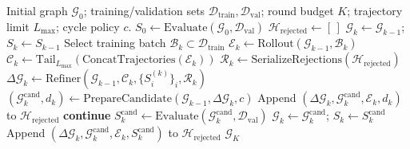 \begingroup
\setlength{\intextsep}{5pt}
\begin{algorithm}[H]
\small
\caption{Offline Closed-Loop Procedural Graph Self-Evolution}
\label{alg:evolution}
\begin{algorithmic}[1]
    \REQUIRE Initial graph $\mathcal{G}_0$; training/validation sets $\mathcal{D}_{\mathrm{train}},\mathcal{D}_{\mathrm{val}}$;
    round budget $K$; trajectory limit $L_{\max}$; cycle policy $c$.
    \STATE $S_0 \leftarrow \mathrm{Evaluate}(\mathcal{G}_0,\mathcal{D}_{\mathrm{val}})$
    \STATE $\mathcal{H}_{\mathrm{rejected}} \leftarrow [\,]$
        \STATE $\mathcal{G}_k \leftarrow \mathcal{G}_{k-1}$; $S_k \leftarrow S_{k-1}$ 
        \STATE Select training batch $\mathcal{B}_k \subset \mathcal{D}_{\mathrm{train}}$
        \STATE $\mathcal{E}_k \leftarrow \mathrm{Rollout}(\mathcal{G}_{k-1},\mathcal{B}_k)$ 
        \STATE $\mathcal{C}_k \leftarrow \mathrm{Tail}_{L_{\max}}(\mathrm{ConcatTrajectories}(\mathcal{E}_k))$
        \STATE $\mathcal{R}_k \leftarrow \mathrm{SerializeRejections}(\mathcal{H}_{\mathrm{rejected}})$
        \STATE $\Delta\mathcal{G}_k \leftarrow \mathrm{Refiner}(\mathcal{G}_{k-1},\mathcal{C}_k,\{S_i^{(k)}\}_i,\mathcal{R}_k)$
        \STATE $(\mathcal{G}_k^{\mathrm{cand}},d_k) \leftarrow \mathrm{PrepareCandidate}(\mathcal{G}_{k-1},\Delta\mathcal{G}_k,c)$
            \STATE Append $(\Delta\mathcal{G}_k,\mathcal{G}_k^{\mathrm{cand}},\mathcal{E}_k,d_k)$ to $\mathcal{H}_{\mathrm{rejected}}$
            \STATE \textbf{continue} 
        \ENDIF
        \STATE $S_k^{\mathrm{cand}} \leftarrow \mathrm{Evaluate}(\mathcal{G}_k^{\mathrm{cand}},\mathcal{D}_{\mathrm{val}})$
            \STATE $\mathcal{G}_k \leftarrow \mathcal{G}_k^{\mathrm{cand}}$; $S_k \leftarrow S_k^{\mathrm{cand}}$ 
        \ELSE
            \STATE Append $(\Delta\mathcal{G}_k,\mathcal{G}_k^{\mathrm{cand}},\mathcal{E}_k,S_k^{\mathrm{cand}})$ to $\mathcal{H}_{\mathrm{rejected}}$
        \ENDIF
    \ENDFOR
    \RETURN $\mathcal{G}_K$
\end{algorithmic}
\end{algorithm}
\endgroup

